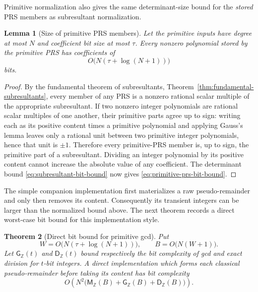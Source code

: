 \documentclass[11pt]{book}
\newtheorem{theorem}{Theorem}[section]
\newtheorem{lemma}[theorem]{Lemma}
\theoremstyle{definition}
\newcommand{\ZZ}{\mathbb Z}
\newcommand{\MZ}{\mathsf M_{\ZZ}}
\begin{document}
Primitive normalization also gives the same determinant-size bound for the
\emph{stored} PRS members as subresultant normalization.

\begin{lemma}[Size of primitive PRS members]
\label{lem:primitive-prs-subresultant-size}
Let the primitive inputs have degree at most $N$ and coefficient bit size at
most $\tau$.  Every nonzero polynomial stored by the primitive PRS has
coefficients of
\begin{equation}\label{eq:primitive-prs-bit-bound}
 O\bigl(N(\tau+\log(N+1))\bigr)
\end{equation}
bits.
\end{lemma}

\begin{proof}
By the fundamental theorem of subresultants,
Theorem~\ref{thm:fundamental-subresultants}, every member of any PRS is a
nonzero rational scalar multiple of the appropriate subresultant.  If two
nonzero integer polynomials are rational scalar multiples of one another,
their primitive parts agree up to sign: writing each as its positive content
times a primitive polynomial and applying Gauss's lemma leaves only a rational
unit between two primitive integer polynomials, hence that unit is $\pm1$.
Therefore every primitive-PRS member is, up to sign, the primitive part of a
subresultant.  Dividing an integer polynomial by its positive content cannot
increase the absolute value of any coefficient.  The determinant bound
\eqref{eq:subresultant-bit-bound} now gives
\eqref{eq:primitive-prs-bit-bound}.
\end{proof}

The simple companion implementation first materializes a raw pseudo-remainder
and only then removes its content.  Consequently its transient integers can be
larger than the normalized bound above.  The next theorem records a direct
worst-case bit bound for this implementation style.

\begin{theorem}[Direct bit bound for primitive gcd]
\label{thm:primitive-gcd-bit-complexity}
Put
\[
 W=O\bigl(N(\tau+\log(N+1))\bigr),
 \qquad
 B=O\bigl(N(W+1)\bigr).
\]
Let $\mathsf G_{\ZZ}(t)$ and $\mathsf D_{\ZZ}(t)$ bound respectively the bit
complexity of gcd and exact division for $t$-bit integers.  A direct
implementation which forms each classical pseudo-remainder before taking its
content has bit complexity
\begin{equation}\label{eq:primitive-gcd-bit-complexity}
 O\!\left(
 N^2\bigl(\MZ(B)+\mathsf G_{\ZZ}(B)+\mathsf D_{\ZZ}(B)\bigr)
 \right).
\end{equation}
\end{theorem}
\end{document}
